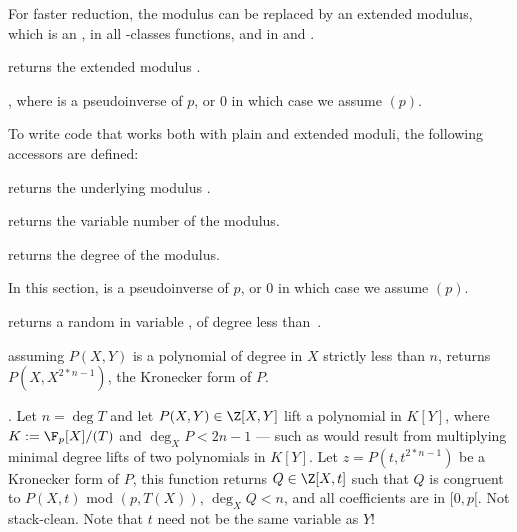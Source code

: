 
For faster reduction, the modulus  can be replaced by an extended
modulus, which is an , in all -classes
functions, and in  and .

 returns the extended modulus
.

, where 
is a pseudoinverse of $p$, or $0$ in which case we assume
$(p)$.

To write code that works both with plain and extended moduli, the following
accessors are defined:

 returns the underlying modulus .

 returns the variable number of the modulus.

 returns the degree of the modulus.


In this section,  is a pseudoinverse of $p$, or $0$ in which case we
assume $(p)$.

 returns a random
 in variable , of degree less than~.

 assuming $P(X,Y)$ is a polynomial
of degree in $X$ strictly less than $n$, returns $P(X,X^{2*n-1})$, the
Kronecker form of $P$.

. Let $n = \deg T$ and let
$P(X,Y)\in \Z[X,Y]$ lift a polynomial in $K[Y]$, where $K := \F_p[X]/(T)$ and
$\deg_X P < 2n-1$ --- such as would result from multiplying minimal degree
lifts of two polynomials in $K[Y]$. Let $z = P(t,t^{2*n-1})$ be a Kronecker
form of $P$, this function returns $Q\in \Z[X,t]$ such that $Q$ is congruent to
$P(X,t)$ mod $(p, T(X))$, $\deg_X Q < n$, and all coefficients are in $[0,p[$.
Not stack-clean. Note that $t$ need not be the same variable as $Y$!




